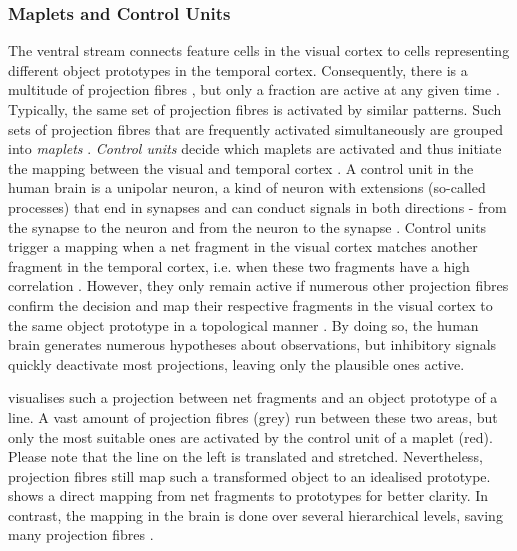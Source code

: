 \subsubsection{Maplets and Control Units}
The ventral stream  connects feature cells in the visual cortex to cells representing different object prototypes in the temporal cortex.  
Consequently, there is a multitude of projection fibres , but only a fraction are active at any given time .
Typically, the same set of projection fibres is activated by similar patterns.
Such sets of projection fibres that are frequently activated simultaneously are grouped into \emph{maplets} .
\emph{Control units} decide which maplets are activated and thus initiate the mapping between the visual and temporal cortex \cite{zhu_maplets_2004}. 
A control unit in the human brain is a unipolar neuron, a kind of neuron with extensions (so-called processes) that end in synapses and can conduct signals in both directions - from the synapse to the neuron and from the neuron to the synapse .
Control units trigger a mapping when a net fragment in the visual cortex matches another fragment in the temporal cortex, i.e. when these two fragments have a high correlation \cite{zhu_maplets_2004}. However, they only remain active if numerous other projection fibres confirm the decision and map their respective fragments in the visual cortex to the same object prototype in a topological manner . By doing so, the human brain generates numerous hypotheses about observations, but inhibitory signals quickly deactivate most projections, leaving only the plausible ones active.

 visualises such a projection between net fragments and an object prototype of a line. A vast amount of projection fibres (grey) run between these two areas, but only the most suitable ones are activated by the control unit of a maplet (red).
Please note that the line on the left is translated and stretched. Nevertheless, projection fibres still map such a transformed object to an idealised prototype.
 shows a direct mapping from net fragments to prototypes for better clarity. In contrast, the mapping in the brain is done over several hierarchical levels, saving many projection fibres .

